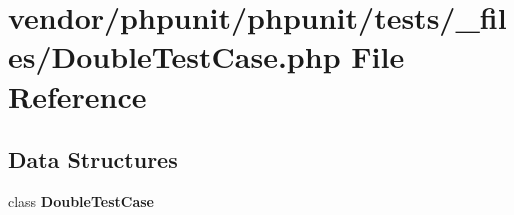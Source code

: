 \section{vendor/phpunit/phpunit/tests/\+\_\+files/\+Double\+Test\+Case.php File Reference}
\label{_double_test_case_8php}
\subsection*{Data Structures}
\begin{DoxyCompactItemize}
\item 
class {\bf Double\+Test\+Case}
\end{DoxyCompactItemize}
